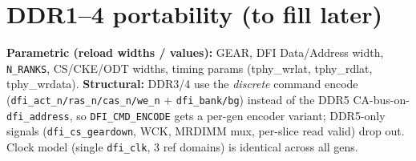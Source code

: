 \documentclass[9pt]{extarticle}
\begin{document}
\section{DDR1--4 portability (to fill later)}
\textbf{Parametric (reload widths / values):} GEAR, DFI Data/Address width, \texttt{N\_RANKS},
CS/CKE/ODT widths, timing params (tphy\_wrlat, tphy\_rdlat, tphy\_wrdata). \textbf{Structural:}
DDR3/4 use the \emph{discrete} command encode (\texttt{dfi\_act\_n/ras\_n/cas\_n/we\_n} +
\texttt{dfi\_bank/bg}) instead of the DDR5 CA-bus-on-\texttt{dfi\_address}, so \texttt{DFI\_CMD\_ENCODE}
gets a per-gen encoder variant; DDR5-only signals (\texttt{dfi\_cs\_geardown}, WCK, MRDIMM mux,
per-slice read valid) drop out. Clock model (single \texttt{dfi\_clk}, 3 ref domains) is identical
across all gens.
\end{document}
